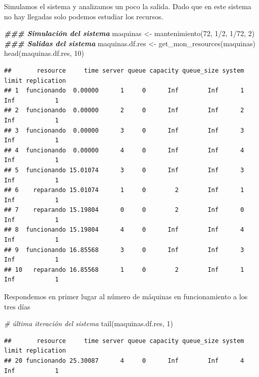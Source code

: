 \documentclass[
]{book}
\newenvironment{Shaded}{\begin{snugshade}}{\end{snugshade}}
\newcommand{\CommentTok}[1]{\textcolor[rgb]{0.56,0.35,0.01}{\textit{#1}}}
\newcommand{\DecValTok}[1]{\textcolor[rgb]{0.00,0.00,0.81}{#1}}
\newcommand{\DocumentationTok}[1]{\textcolor[rgb]{0.56,0.35,0.01}{\textbf{\textit{#1}}}}
\newcommand{\FunctionTok}[1]{\textcolor[rgb]{0.00,0.00,0.00}{#1}}
\newcommand{\NormalTok}[1]{#1}
\newcommand{\OtherTok}[1]{\textcolor[rgb]{0.56,0.35,0.01}{#1}}
\newcommand{\SpecialCharTok}[1]{\textcolor[rgb]{0.00,0.00,0.00}{#1}}
\theoremstyle{definition}
\theoremstyle{definition}
\theoremstyle{definition}
\theoremstyle{definition}
\theoremstyle{remark}
\begin{document}
Simulamos el sistema y analizamos un poco la salida. Dado que en este sistema no hay llegadas solo podemos estudiar los recursos.

\begin{Shaded}
\begin{Highlighting}[]
\DocumentationTok{\#\#\# Simulación del sistema}
\NormalTok{maquinas }\OtherTok{\textless{}{-}} \FunctionTok{mantenimiento}\NormalTok{(}\DecValTok{72}\NormalTok{, }\DecValTok{1}\SpecialCharTok{/}\DecValTok{2}\NormalTok{, }\DecValTok{1}\SpecialCharTok{/}\DecValTok{72}\NormalTok{, }\DecValTok{2}\NormalTok{)}
\DocumentationTok{\#\#\# Salidas del sistema}
\NormalTok{maquinas.df.res }\OtherTok{\textless{}{-}} \FunctionTok{get\_mon\_resources}\NormalTok{(maquinas)}
\FunctionTok{head}\NormalTok{(maquinas.df.res, }\DecValTok{10}\NormalTok{)}
\end{Highlighting}
\end{Shaded}

\begin{verbatim}
##       resource     time server queue capacity queue_size system limit replication
## 1  funcionando  0.00000      1     0      Inf        Inf      1   Inf           1
## 2  funcionando  0.00000      2     0      Inf        Inf      2   Inf           1
## 3  funcionando  0.00000      3     0      Inf        Inf      3   Inf           1
## 4  funcionando  0.00000      4     0      Inf        Inf      4   Inf           1
## 5  funcionando 15.01074      3     0      Inf        Inf      3   Inf           1
## 6    reparando 15.01074      1     0        2        Inf      1   Inf           1
## 7    reparando 15.19804      0     0        2        Inf      0   Inf           1
## 8  funcionando 15.19804      4     0      Inf        Inf      4   Inf           1
## 9  funcionando 16.85568      3     0      Inf        Inf      3   Inf           1
## 10   reparando 16.85568      1     0        2        Inf      1   Inf           1
\end{verbatim}

Respondemos en primer lugar al número de máquinas en funcionamiento a los tres días

\begin{Shaded}
\begin{Highlighting}[]
\CommentTok{\# última iteración del sistema}
\FunctionTok{tail}\NormalTok{(maquinas.df.res, }\DecValTok{1}\NormalTok{)}
\end{Highlighting}
\end{Shaded}

\begin{verbatim}
##       resource     time server queue capacity queue_size system limit replication
## 20 funcionando 25.30087      4     0      Inf        Inf      4   Inf           1
\end{verbatim}
\end{document}
